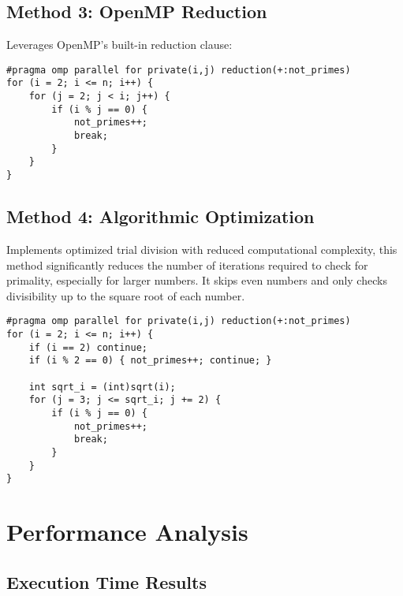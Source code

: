\documentclass[11pt]{article}
\begin{document}
\subsection{Method 3: OpenMP Reduction}

Leverages OpenMP's built-in reduction clause:

\begin{verbatim}
#pragma omp parallel for private(i,j) reduction(+:not_primes)
for (i = 2; i <= n; i++) {
    for (j = 2; j < i; j++) {
        if (i % j == 0) {
            not_primes++;
            break;
        }
    }
}
\end{verbatim}

\subsection{Method 4: Algorithmic Optimization}

Implements optimized trial division with reduced computational complexity, this method significantly reduces the number of iterations required to check for primality, especially for larger numbers. It skips even numbers and only checks divisibility up to the square root of each number.

\begin{verbatim}
#pragma omp parallel for private(i,j) reduction(+:not_primes)
for (i = 2; i <= n; i++) {
    if (i == 2) continue;
    if (i % 2 == 0) { not_primes++; continue; }
    
    int sqrt_i = (int)sqrt(i);
    for (j = 3; j <= sqrt_i; j += 2) {
        if (i % j == 0) {
            not_primes++;
            break;
        }
    }
}
\end{verbatim}


\section{Performance Analysis}

\subsection{Execution Time Results}
\end{document}
